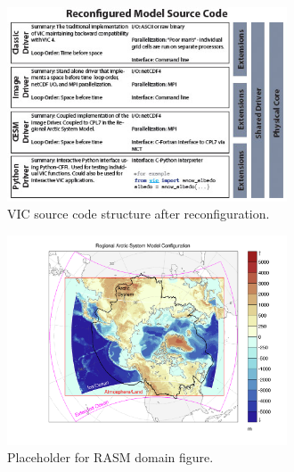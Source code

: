 \documentclass[gmd, manuscript]{copernicus}
\begin{document}









\clearpage
\begin{figure}[t]
\includegraphics[width=8.3cm]{VIC_config.jpg}
\caption{VIC source code structure after reconfiguration. }
\label{fig:vic_config}
\end{figure}

%
%
\clearpage
\begin{figure}[t]
\includegraphics[width=8.3cm]{RASM_Domain.png}
\caption{Placeholder for RASM domain figure.}
\label{fig:vic_domain}
\end{figure}
\end{document}
